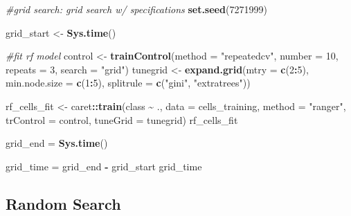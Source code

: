 \documentclass[12pt]{article}
\newenvironment{Shaded}{\begin{snugshade}}{\end{snugshade}}
\newcommand{\CommentTok}[1]{\textcolor[rgb]{0.56,0.35,0.01}{\textit{#1}}}
\newcommand{\DataTypeTok}[1]{\textcolor[rgb]{0.13,0.29,0.53}{#1}}
\newcommand{\DecValTok}[1]{\textcolor[rgb]{0.00,0.00,0.81}{#1}}
\newcommand{\KeywordTok}[1]{\textcolor[rgb]{0.13,0.29,0.53}{\textbf{#1}}}
\newcommand{\NormalTok}[1]{#1}
\newcommand{\OperatorTok}[1]{\textcolor[rgb]{0.81,0.36,0.00}{\textbf{#1}}}
\newcommand{\StringTok}[1]{\textcolor[rgb]{0.31,0.60,0.02}{#1}}
\begin{document}
\begin{Shaded}
\begin{Highlighting}[]
\CommentTok{\#grid search: grid search w/ specifications}
\KeywordTok{set.seed}\NormalTok{(}\DecValTok{7271999}\NormalTok{)}

\NormalTok{grid\_start <{-}}\StringTok{ }\KeywordTok{Sys.time}\NormalTok{()}

\CommentTok{\#fit rf model}
\NormalTok{control <{-}}\StringTok{ }\KeywordTok{trainControl}\NormalTok{(}\DataTypeTok{method =} \StringTok{"repeatedcv"}\NormalTok{, }
                        \DataTypeTok{number =} \DecValTok{10}\NormalTok{, }\DataTypeTok{repeats =} \DecValTok{3}\NormalTok{, }\DataTypeTok{search =} \StringTok{"grid"}\NormalTok{)}
\NormalTok{tunegrid <{-}}\StringTok{ }\KeywordTok{expand.grid}\NormalTok{(}\DataTypeTok{mtry =} \KeywordTok{c}\NormalTok{(}\DecValTok{2}\OperatorTok{:}\DecValTok{5}\NormalTok{), }
                        \DataTypeTok{min.node.size =} \KeywordTok{c}\NormalTok{(}\DecValTok{1}\OperatorTok{:}\DecValTok{5}\NormalTok{),}
                        \DataTypeTok{splitrule =} \KeywordTok{c}\NormalTok{(}\StringTok{"gini"}\NormalTok{, }\StringTok{"extratrees"}\NormalTok{))}

\NormalTok{rf\_cells\_fit <{-}}\StringTok{ }\NormalTok{caret}\OperatorTok{::}\KeywordTok{train}\NormalTok{(class }\OperatorTok{\textasciitilde{}}\StringTok{ }\NormalTok{.,}
                     \DataTypeTok{data =}\NormalTok{ cells\_training,}
                     \DataTypeTok{method =} \StringTok{"ranger"}\NormalTok{,}
                     \DataTypeTok{trControl =}\NormalTok{ control,}
                     \DataTypeTok{tuneGrid =}\NormalTok{ tunegrid)}
\NormalTok{rf\_cells\_fit}

\NormalTok{grid\_end =}\StringTok{ }\KeywordTok{Sys.time}\NormalTok{()}

\NormalTok{grid\_time =}\StringTok{ }\NormalTok{grid\_end }\OperatorTok{{-}}\StringTok{ }\NormalTok{grid\_start}
\NormalTok{grid\_time}
\end{Highlighting}
\end{Shaded}

\hypertarget{random-search}{%
\subsection{Random Search}\label{random-search}}
\end{document}

